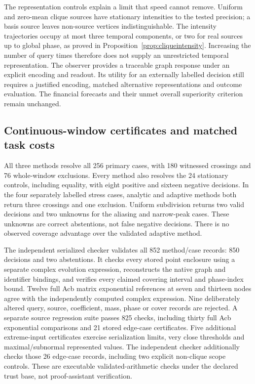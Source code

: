 \documentclass[11pt,a4paper]{article}
\theoremstyle{definition}\newtheorem{definition}[theorem]{Definition}
\begin{document}
The representation controls explain a limit that speed cannot remove.
Uniform and zero-mean clique sources have stationary intensities to the tested
precision; a basis source leaves non-source vertices indistinguishable. The
intensity trajectories occupy at most three temporal components, or two for
real sources up to global phase, as proved in
Proposition~\ref{prop:cliqueintensity}. Increasing the number of query times
therefore does not supply an unrestricted temporal representation. The observer
provides a traceable graph response under an explicit encoding and readout.
Its utility for an externally labelled decision still requires a justified
encoding, matched alternative representations and outcome evaluation. The
financial forecasts and their unmet overall superiority criterion remain
unchanged.

\subsection{Continuous-window certificates and matched task costs}\label{sec:windowresults}
All three methods resolve all 256 primary cases, with 180 witnessed crossings and 76 whole-window exclusions. Every method also resolves the 24 stationary controls, including equality, with eight positive and sixteen negative decisions. In the four separately labelled stress cases, analytic and adaptive methods both return three crossings and one exclusion. Uniform subdivision returns two valid decisions and two unknowns for the aliasing and narrow-peak cases. These unknowns are correct abstentions, not false negative decisions. There is no observed coverage advantage over the validated adaptive method.

The independent serialized checker validates all 852 method/case records: 850 decisions and two abstentions. It checks every stored point enclosure using a separate complex evolution expression, reconstructs the native graph and identifier bindings, and verifies every claimed covering interval and phase-index bound. Twelve full Acb matrix exponential references at seven and thirteen nodes agree with the independently computed complex expression. Nine deliberately altered query, source, coefficient, mass, phase or cover records are rejected. A separate source regression suite passes 825 checks, including thirty full Acb exponential comparisons and 21 stored edge-case certificates. Five additional extreme-input certificates exercise serialization limits, very close thresholds and maximal/subnormal represented values. The independent checker additionally checks those 26 edge-case records, including two explicit non-clique scope controls. These are executable validated-arithmetic checks under the declared trust base, not proof-assistant verification.
\end{document}
